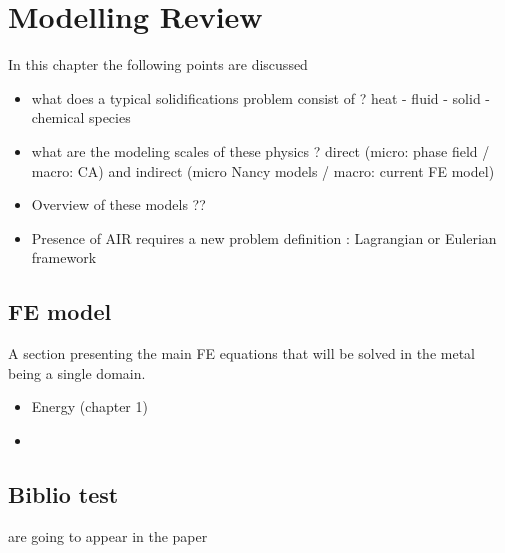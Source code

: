 \chapter{Modelling Review}
\minitoc
\newpage

In this chapter the following points are discussed
\begin{itemize}
\item what does a typical solidifications problem consist of ? heat - fluid - solid 
- chemical species
\item what are the modeling scales of these physics ? direct (micro: phase field / macro: CA) 
and indirect (micro Nancy models / macro: current FE model)
\item Overview of these models ??
\item Presence of AIR requires a new problem definition : Lagrangian or Eulerian framework
\end{itemize}


\section{FE model}
A section presenting the main FE equations that will be solved in the metal being a single domain.
\begin{itemize}
\item Energy (chapter 1)
\item
\end{itemize}


\section{Biblio test}
\cite{carozzani_direct_2013} are going to appear in the paper 